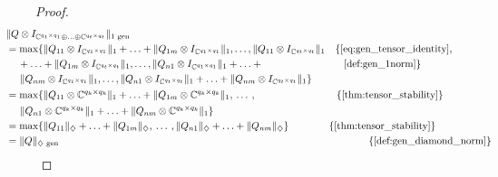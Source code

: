 \begin{proof}
    \begin{align*}
      & \hspace{-30pt} \lVert Q \otimes I_{\mathbb{C}^{q_1 \times q_1} \oplus \ldots \oplus \mathbb{C}^{q_t \times q_t}} \rVert_{1 \text{ gen}} \\
      & \hspace{-30pt}  = \max \{ \lVert Q_{11}  \otimes I_{\mathbb{C}^{q_1 \times q_1}}  \rVert_{1}  + \ldots +  \lVert Q_{1m}  \otimes I_{\mathbb{C}^{q_1 \times q_1}} \rVert_{1},  \ldots ,  \lVert Q_{11} \otimes I_{\mathbb{C}^{q_t \times q_t}} \rVert_{1}   \quad \{\text{\autoref{eq:gen_tensor_identity}, } \\
      & \hspace{-18pt}  + \ldots + \lVert Q_{1m} \otimes I_{\mathbb{C}^{q_t \times q_t}} \rVert_{1}, \ldots,  \lVert Q_{n1}  \otimes I_{\mathbb{C}^{q_1 \times q_1}}  \rVert_{1} + \ldots +  \hspace{80 pt} \text{\autoref{def:gen_1norm}} \} \\
      & \hspace{-16pt}\lVert Q_{nm}  \otimes I_{\mathbb{C}^{q_1 \times q_1}} \rVert_{1}, \ldots,  \lVert Q_{n1} \otimes I_{\mathbb{C}^{q_t \times q_t}} \rVert_{1} + \ldots + \lVert Q_{nm} \otimes I_{\mathbb{C}^{q_t \times q_t}} \rVert_{1} \} \\
      &  \hspace{-30pt}  = \max \{ \|Q_{11} \otimes \mathbb{C}^{q_k \times q_k}\|_{1} + \ldots + \|Q_{1m} \otimes \mathbb{C}^{q_k \times q_k}\|_{1}, \hspace{2pt} \ldots \hspace{2pt} , \hspace {80 pt}  \{ \text{\autoref{thm:tensor_stability}}\}\\
      & \hspace{-16pt} \|Q_{n1} \otimes \mathbb{C}^{q_k \times q_k}\|_{1} + \ldots + \|Q_{nm} \otimes \mathbb{C}^{q_k \times q_k}\|_{1} \} \\
      &  \hspace{-30pt} = \max \{\|Q_{11}\|_{\diamondsuit} + \ldots + \|Q_{1m}\|_{\diamondsuit}, \hspace{2pt} \ldots \hspace{2pt}, \|Q_{n1}\|_{\diamondsuit} + \ldots + \|Q_{nm}\|_{\diamondsuit} \} \hspace{40pt}\{ \text{\autoref{thm:tensor_stability}}\} \\
      & \hspace{-30pt}  = \lVert Q \rVert_{\diamondsuit \text{ gen}}  \hspace{308 pt}  \{ \text{\autoref{def:gen_diamond_norm}}\}
    \end{align*} 
  \end{proof}
  
